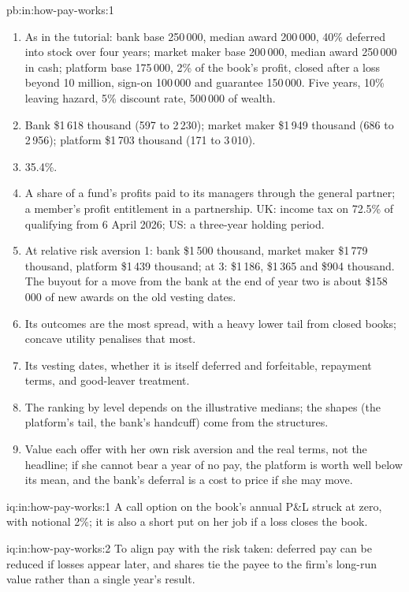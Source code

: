 \begin{solution}{pb:in:how-pay-works:1}
\begin{enumerate}
\item As in the tutorial: bank base 250\,000, median award 200\,000, 40\% deferred into stock over four years; market maker
base 200\,000, median award 250\,000 in cash; platform base 175\,000, 2\% of the book's profit, closed after a loss
beyond 10 million, sign-on 100\,000 and guarantee 150\,000. Five years, 10\% leaving hazard, 5\% discount rate, 500\,000
of wealth.
\item Bank \$1\,618 thousand (597 to 2\,230); market maker \$1\,949 thousand (686 to 2\,956); platform \$1\,703 thousand
(171 to 3\,010).
\item 35.4\%.
\item A share of a fund's profits paid to its managers through the general partner; a member's profit entitlement in a
partnership. UK: income tax on 72.5\% of qualifying  from 6 April 2026; US: a three-year holding period.
\item At relative risk aversion 1: bank \$1\,500 thousand, market maker \$1\,779 thousand, platform \$1\,439 thousand; at
3: \$1\,186, \$1\,365 and \$904 thousand. The buyout for a move from the bank at the end of year two is about \$158\,000
of new awards on the old vesting dates.
\item Its outcomes are the most spread, with a heavy lower tail from closed books; concave utility penalises that most.
\item Its vesting dates, whether it is itself deferred and forfeitable, repayment terms, and good-leaver treatment.
\item The ranking by level depends on the illustrative medians; the shapes (the platform's tail, the bank's handcuff) come
from the structures.
\item Value each offer with her own risk aversion and the real terms, not the headline; if she cannot bear a year of no
pay, the platform is worth well below its mean, and the bank's deferral is a cost to price if she may move.
\end{enumerate}
\end{solution}

\begin{solution}{iq:in:how-pay-works:1}
A call option on the book's annual P\&L struck at zero, with notional 2\%; it is also a short put on her job if a loss
closes the book.
\end{solution}

\begin{solution}{iq:in:how-pay-works:2}
To align pay with the risk taken: deferred pay can be reduced if losses appear later, and shares tie the payee to the
firm's long-run value rather than a single year's result.
\end{solution}

